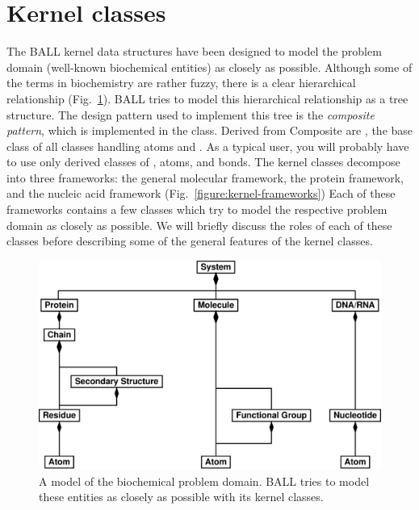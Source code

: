 \section{Kernel classes}
The BALL kernel data structures have been designed to model the problem 
domain (\ie well-known biochemical entities) as closely as possible.
Although some of the terms in biochemistry are rather fuzzy, there is a clear
hierarchical relationship (Fig.~\ref{figure:problem-domain}).
BALL tries to model this hierarchical relationship as a tree structure.
The design pattern used to implement this tree is the {\em composite
pattern}\cite{DesignPatterns}, which is implemented in the  class.
Derived from Composite are , the base class of all
classes handling atoms and . As a typical user, you will probably
have to use only derived classes of , atoms, and bonds.
The kernel classes decompose into three frameworks: the general molecular
framework, the protein framework, and the nucleic acid framework
(Fig.~\ref{figure:kernel-frameworks})
Each of these frameworks contains a few classes which try to model the
respective problem domain as closely as possible. We will briefly discuss the
roles of each of these classes before describing some of the general features
of the kernel classes.

\begin{figure}[tb]
  \centering\includegraphics[width=\textwidth]{problem-domain.eps}
  \caption{A model of the biochemical problem domain. BALL tries to model
					these entities as closely as possible with its kernel classes.}
  \label{figure:problem-domain}
\end{figure}

